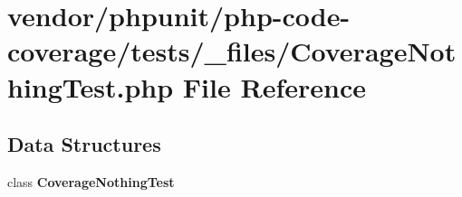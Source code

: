 \section{vendor/phpunit/php-\/code-\/coverage/tests/\+\_\+files/\+Coverage\+Nothing\+Test.php File Reference}
\label{php-code-coverage_2tests_2__files_2_coverage_nothing_test_8php}
\subsection*{Data Structures}
\begin{DoxyCompactItemize}
\item 
class {\bf Coverage\+Nothing\+Test}
\end{DoxyCompactItemize}
